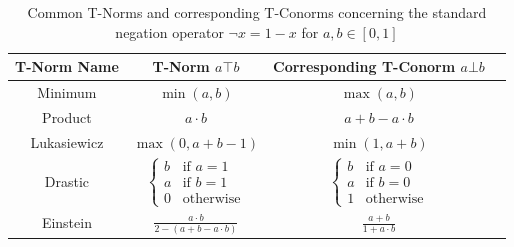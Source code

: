 \begin{table}[H]
      \centering
      {\renewcommand{\arraystretch}{1.2}
            \begin{tabular}{|c|c|c|c|}
                  \hline
                  T-Norm Name & T-Norm   $a \top b$                                                                              & Corresponding T-Conorm      $a \bot b$                                                           \\
                  \hline
                  Minimum     & $\min(a, b)$                                                                                     & $\max(a, b)$                                                                                     \\
                  Product     & $a \cdot b$                                                                                      & $a + b - a \cdot b$                                                                              \\
                  Lukasiewicz & $\max(0, a + b - 1)$                                                                             & $\min(1, a + b)$                                                                                 \\
                  Drastic     & $\begin{cases} b & \text{if } a = 1 \\ a & \text{if } b = 1 \\ 0 & \text{otherwise} \end{cases}$ & $\begin{cases} b & \text{if } a = 0 \\ a & \text{if } b = 0 \\ 1 & \text{otherwise} \end{cases}$ \\
                  Einstein    & $\frac{a \cdot b}{2 - (a + b - a \cdot b)}$                                                      & $\frac{a + b}{1 + a \cdot b}$                                                                    \\

                  \hline
            \end{tabular}
      }
      \caption{Common T-Norms and corresponding T-Conorms concerning the standard negation operator $\neg x = 1 - x$
            for $a, b \in [0, 1]$}
      \label{tab:tnorms}
\end{table}

